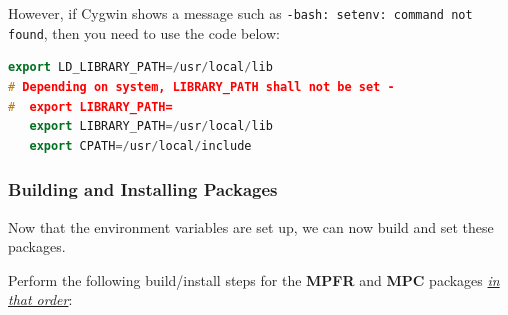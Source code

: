 However, if Cygwin shows a message such as \texttt{-bash: setenv: command not found}, then you need to use the code below: 
\begin{center}\begin{minipage}{0.9\linewidth}

\begin{lstlisting}[language=c++, caption=Adapted from \cite{installnewerGCC}, captionpos=b]
   export LD_LIBRARY_PATH=/usr/local/lib
# Depending on system, LIBRARY_PATH shall not be set - 
#  export LIBRARY_PATH=
   export LIBRARY_PATH=/usr/local/lib
   export CPATH=/usr/local/include
\end{lstlisting}
\end{minipage}\end{center}

	\subsubsection*{Building and Installing Packages}
Now that the environment variables are set up, we can now build and set these packages. 

Perform the following build/install steps for the \textbf{MPFR} and \textbf{MPC} packages \textit{\underline{in that order}}:

